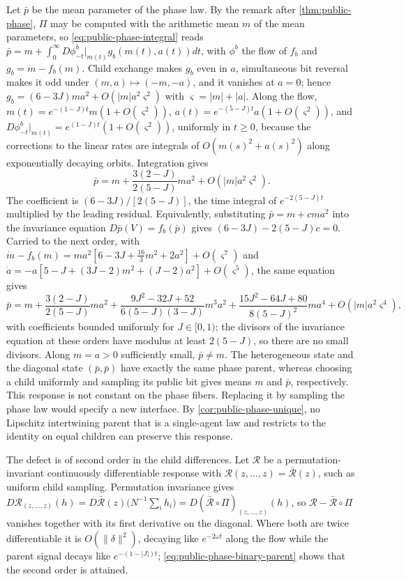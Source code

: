 Let $\bar p$ be the mean parameter of the phase law. By the remark after \cref{thm:public-phase}, $\Pi$ may be computed with the arithmetic mean $m$ of the mean parameters, so \cref{eq:public-phase-integral} reads $\bar p=m+\int_0^\infty D\phi^b_{-t}|_{m(t)}g_b(m(t),a(t))dt$, with $\phi^b$ the flow of $f_b$ and $g_b=\dot m-f_b(m)$. Child exchange makes $g_b$ even in $a$, simultaneous bit reversal makes it odd under $(m,a)\mapsto(-m,-a)$, and it vanishes at $a=0$; hence $g_b=(6-3J)ma^2+O(|m|a^2\varsigma^2)$ with $\varsigma=|m|+|a|$. Along the flow, $m(t)=e^{-(1-J)t}m(1+O(\varsigma^2))$, $a(t)=e^{-(5-J)t}a(1+O(\varsigma^2))$, and $D\phi^b_{-t}|_{m(t)}=e^{(1-J)t}(1+O(\varsigma^2))$, uniformly in $t\ge0$, because the corrections to the linear rates are integrals of $O(m(s)^2+a(s)^2)$ along exponentially decaying orbits. Integration gives
\begin{equation}
 \bar p=m+\frac{3(2-J)}{2(5-J)}ma^2+O(|m|a^2\varsigma^2).
 \label{eq:public-phase-binary-parent}
\end{equation}
The coefficient is $(6-3J)/[2(5-J)]$, the time integral of $e^{-2(5-J)t}$ multiplied by the leading residual. Equivalently, substituting $\bar p=m+cma^2$ into the invariance equation $D\bar p(V)=f_b(\bar p)$ gives $(6-3J)-2(5-J)c=0$. Carried to the next order, with $\dot m-f_b(m)=ma^2[6-3J+\tfrac{16}3m^2+2a^2]+O(\varsigma^7)$ and $\dot a=-a[5-J+(3J-2)m^2+(J-2)a^2]+O(\varsigma^5)$, the same equation gives
\begin{equation}
 \bar p=m+\frac{3(2-J)}{2(5-J)}ma^2+\frac{9J^2-32J+52}{6(5-J)(3-J)}m^3a^2+\frac{15J^2-64J+80}{8(5-J)^2}ma^4+O(|m|a^2\varsigma^4),
 \label{eq:public-phase-binary-parent-next}
\end{equation}
with coefficients bounded uniformly for $J\in[0,1)$; the divisors of the invariance equation at these orders have modulus at least $2(5-J)$, so there are no small divisors. Along $m=a>0$ sufficiently small, $\bar p\ne m$. The heterogeneous state and the diagonal state $(\bar p,\bar p)$ have exactly the same phase parent, whereas choosing a child uniformly and sampling its public bit gives means $m$ and $\bar p$, respectively. This response is not constant on the phase fibers. Replacing it by sampling the phase law would specify a new interface. By \cref{cor:public-phase-unique}, no Lipschitz intertwining parent that is a single-agent law and restricts to the identity on equal children can preserve this response.

The defect is of second order in the child differences. Let $\mathcal R$ be a permutation-invariant continuously differentiable response with $\mathcal R(z,\ldots,z)=\bar{\mathcal R}(z)$, such as uniform child sampling. Permutation invariance gives $D\mathcal R_{(z,\ldots,z)}(h)=D\bar{\mathcal R}(z)\bigl(N^{-1}\sum_ih_i\bigr)=D(\bar{\mathcal R}\circ\Pi)_{(z,\ldots,z)}(h)$, so $\mathcal R-\bar{\mathcal R}\circ\Pi$ vanishes together with its first derivative on the diagonal. Where both are twice differentiable it is $O(\|\delta\|^2)$, decaying like $e^{-2\omega t}$ along the flow while the parent signal decays like $e^{-(1-|J|)t}$; \cref{eq:public-phase-binary-parent} shows that the second order is attained.

